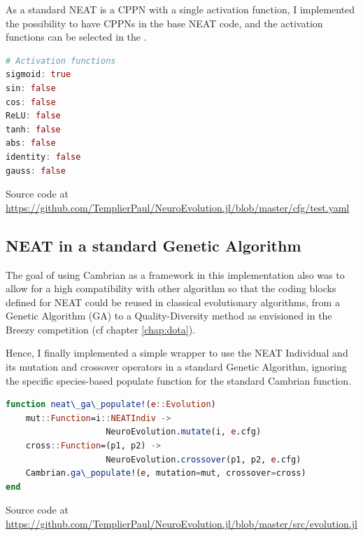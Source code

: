 As a standard NEAT is a CPPN with a single activation function, I implemented the possibility to have CPPNs in the base NEAT code, and the activation functions can be selected in the .

\begin{minipage}{\linewidth}
\begin{lstlisting}[language=Julia, caption=Available activation functions in my implementation]
# Activation functions
sigmoid: true
sin: false
cos: false
ReLU: false
tanh: false
abs: false
identity: false
gauss: false
\end{lstlisting}
Source code at \url{https://github.com/TemplierPaul/NeuroEvolution.jl/blob/master/cfg/test.yaml}\\
\end{minipage}

\subsection{NEAT in a standard Genetic Algorithm}
\label{sec:neat-ga}

The goal of using Cambrian as a framework in this implementation also was to allow for a high compatibility with other algorithm so that the coding blocks defined for NEAT could be reused in classical evolutionary algorithms, from a Genetic Algorithm (GA) to a Quality-Diversity method as envisioned in the Breezy competition (cf chapter \ref{chap:dota}). 

Hence, I finally implemented a simple wrapper to use the NEAT Individual and its mutation and crossover operators in a standard Genetic Algorithm, ignoring the specific species-based populate function for the standard Cambrian  function.

\begin{minipage}{\linewidth}
\begin{lstlisting}[language=Julia, caption=Genetic Algorithm populate for NEAT]
function neat\_ga\_populate!(e::Evolution)
    mut::Function=i::NEATIndiv -> 
                    NeuroEvolution.mutate(i, e.cfg)
    cross::Function=(p1, p2) -> 
                    NeuroEvolution.crossover(p1, p2, e.cfg)
    Cambrian.ga\_populate!(e, mutation=mut, crossover=cross)
end
\end{lstlisting}
Source code at \url{https://github.com/TemplierPaul/NeuroEvolution.jl/blob/master/src/evolution.jl}\\
\end{minipage}

